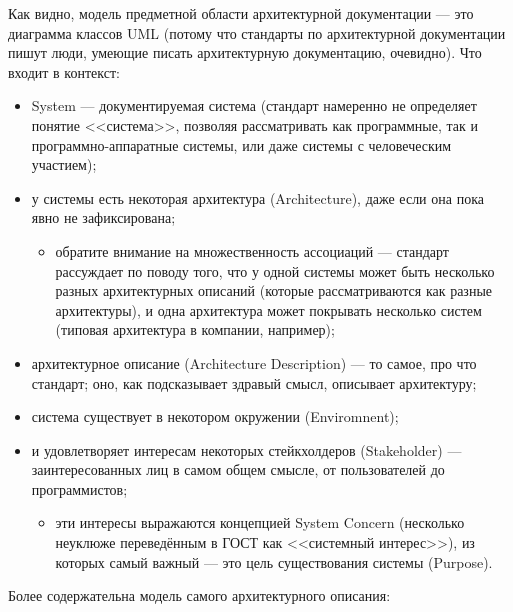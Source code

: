 \documentclass[a5paper]{article}
\begin{document}
Как видно, модель предметной области архитектурной документации --- это диаграмма классов UML (потому что стандарты по архитектурной документации пишут люди, умеющие писать архитектурную документацию, очевидно). Что входит в контекст:

\begin{itemize}
    \item System --- документируемая система (стандарт намеренно не определяет понятие <<система>>, позволяя рассматривать как программные, так и программно-аппаратные системы, или даже системы с человеческим участием);
    \item у системы есть некоторая архитектура (Architecture), даже если она пока явно не зафиксирована;
    \begin{itemize}
        \item обратите внимание на множественность ассоциаций --- стандарт рассуждает по поводу того, что у одной системы может быть несколько разных архитектурных описаний (которые рассматриваются как разные архитектуры), и одна архитектура может покрывать несколько систем (типовая архитектура в компании, например);
    \end{itemize}
    \item архитектурное описание (Architecture Description) --- то самое, про что стандарт; оно, как подсказывает здравый смысл, описывает архитектуру;
    \item система существует в некотором окружении (Enviromnent);
    \item и удовлетворяет интересам некоторых стейкхолдеров (Stakeholder) --- заинтересованных лиц в самом общем смысле, от пользователей до программистов;
    \begin{itemize}
        \item эти интересы выражаются концепцией System Concern (несколько неуклюже переведённым в ГОСТ как <<системный интерес>>), из которых самый важный --- это цель существования системы (Purpose).
    \end{itemize}
\end{itemize}

Более содержательна модель самого архитектурного описания:
\end{document}
